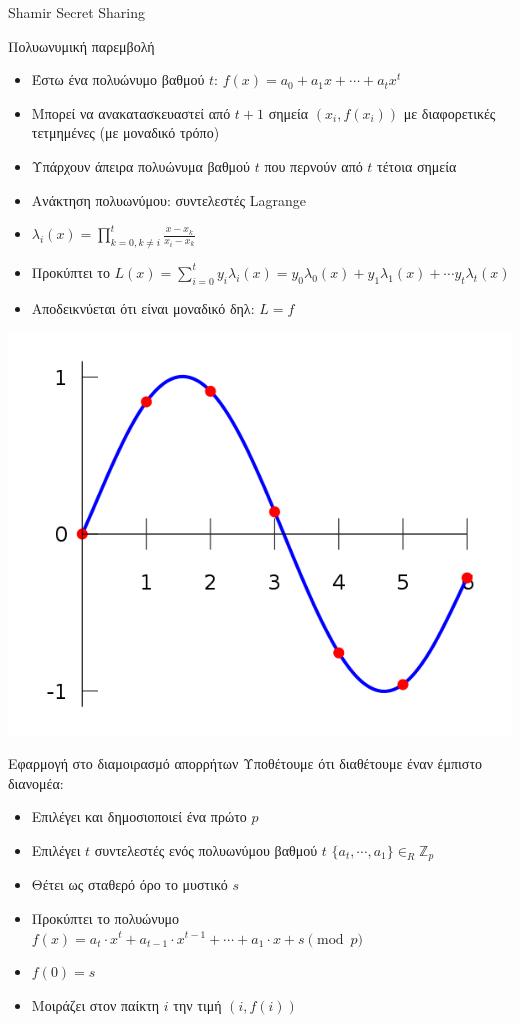\documentclass[handout]{beamer}
\begin{document}
\begin{frame}[allowframebreaks]{Shamir Secret Sharing}

\begin{block}{Πολυωνυμική παρεμβολή}
\begin{itemize}
\item Έστω ένα πολυώνυμο βαθμού $t$: $f(x) = a_0+a_1x+\cdots+a_tx^t$
\item Μπορεί να ανακατασκευαστεί από $t+1$ σημεία $(x_i,f(x_i))$ με διαφορετικές τετμημένες (με μοναδικό τρόπο)
\item Υπάρχουν άπειρα πολυώνυμα βαθμού $t$ που περνούν από $t$ τέτοια σημεία
\item Ανάκτηση πολυωνύμου: συντελεστές Lagrange
\item $\lambda_i(x) = \prod_{k=0, k \neq i}^t \frac{x-x_k}{x_i-x_k}$
\item Προκύπτει το $L(x) = \sum_{i=0}^t y_i \lambda_i(x) = y_0 \lambda_0(x) + y_1 \lambda_1(x) + \cdots y_t \lambda_t (x) $
\item Αποδεικνύεται ότι είναι μοναδικό δηλ: $L = f$
\end{itemize}
\end{block}
\framebreak

\includegraphics[scale=0.4]{polynomialinterpolation.png}

\framebreak

\begin{block}{Εφαρμογή στο διαμοιρασμό απορρήτων}
Υποθέτουμε ότι διαθέτουμε έναν έμπιστο διανομέα:
\begin{itemize}
\item Επιλέγει και δημοσιοποιεί ένα πρώτο $p$
\item Επιλέγει $t$ συντελεστές ενός πολυωνύμου βαθμού $t$ $\{a_t, \cdots, a_1 \} \in_R \mathbb{Z}_p$
\item Θέτει ως σταθερό όρο το μυστικό $s$
\item Προκύπτει το πολυώνυμο $f(x) = a_t \cdot x^t +  a_{t-1} \cdot x^{t-1} + \cdots + a_{1} \cdot x + s \pmod{p}$
\item $f(0)=s$
\item Μοιράζει στον παίκτη $i$ την τιμή $(i,f(i))$
\end{itemize}
\end{block}


\end{frame}
\end{document}
